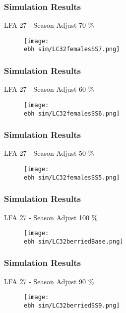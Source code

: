 \documentclass{beamer}
\newcommand{\ebh}{\string~/bio.data/bio.lobster/figures/LFA2733Framework2018/} %
\begin{document}
\begin{frame}
\frametitle{Simulation Results}
LFA 27 - Season Adjust 70 \%
\begin{figure}
        \begin{center}
            \texttt{[image: \\ebh sim/LC32femalesSS7.png]}
        \end{center}
    \end{figure}
\end{frame}


\begin{frame}
\frametitle{Simulation Results}
LFA 27 - Season Adjust 60 \%
\begin{figure}
        \begin{center}
            \texttt{[image: \\ebh sim/LC32femalesSS6.png]}
        \end{center}
    \end{figure}
\end{frame}


\begin{frame}
\frametitle{Simulation Results}
LFA 27 - Season Adjust 50 \%
\begin{figure}
        \begin{center}
            \texttt{[image: \\ebh sim/LC32femalesSS5.png]}
        \end{center}
    \end{figure}
\end{frame}






\begin{frame}
\frametitle{Simulation Results}
LFA 27 - Season Adjust 100 \%
\begin{figure}
        \begin{center}
            \texttt{[image: \\ebh sim/LC32berriedBase.png]}
        \end{center}
    \end{figure}
\end{frame}


\begin{frame}
\frametitle{Simulation Results}
LFA 27 - Season Adjust 90 \%
\begin{figure}
        \begin{center}
            \texttt{[image: \\ebh sim/LC32berriedSS9.png]}
        \end{center}
    \end{figure}
\end{frame}
\end{document}
